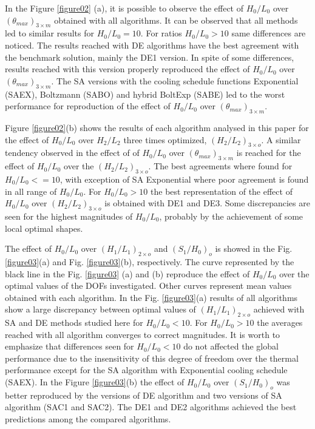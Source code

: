 \documentclass[12pt,fleqn]{article}
\begin{document}
In the Figure \ref{figure02} (a), it is possible to observe the effect of $H_{0}/L_{0}$ over $({\theta}_{max})_{3\times m}$ obtained with all algorithms. It can be observed that all methods led to similar results for $H_{0}/L_{0}=10$. For ratios $H_{0}/L_{0}>10$ same differences are noticed. The results reached with DE algorithms have the best agreement with the benchmark solution, mainly the DE1 version. In spite of some differences, results reached with this version properly reproduced the effect of $H_{0}/L_{0}$ over $({\theta}_{max})_{3\times m}$. The SA versions with the cooling schedule functions Exponential (SAEX), Boltzmann (SABO) and hybrid BoltExp (SABE) led to the worst performance for reproduction of the effect of  $H_{0}/L_{0}$ over $({\theta}_{max})_{3\times m}$.

Figure \ref{figure02}(b) shows the results of each algorithm analysed in this paper for the effect of  $H_{0}/L_{0}$ over $H_{2}/L_{2}$ three times optimized, $(H_{2}/L_{2})_{3\times o}$. A similar tendency observed in the effect of of $H_{0}/L_{0}$ over $({\theta}_{max})_{3\times m}$ is reached for the effect of $H_{0}/L_{0}$ over the $(H_{2}/L_{2})_{3\times o}$. The best agreements where found for $H_{0}/L_{0}<=10$, with exception of SA Exponential where poor agreement is found in all range of $H_{0}/L_{0}$. For $H_{0}/L_{0}>10$ the best representation of the effect of $H_{0}/L_{0}$ over $(H_{2}/L_{2})_{3\times o}$ is obtained with DE1 and DE3. Some discrepancies are seen for the highest magnitudes of $H_{0}/L_{0}$, probably by the achievement of some local optimal shapes.

The effect of $H_{0}/L_{0}$ over $(H_{1}/L_{1})_{2\times o}$ and $(S_{1}/H_{0})_{o}$ is showed in the Fig. \ref{figure03}(a) and Fig. \ref{figure03}(b), respectively. The curve represented by the black line in the Fig. \ref{figure03} (a) and (b) reproduce the effect of $H_{0}/L_{0}$ over the optimal values of the DOFs investigated. Other curves represent mean values obtained with each algorithm. In the Fig. \ref{figure03}(a) results of all algorithms show a large discrepancy between optimal values of $(H_{1}/L_{1})_{2\times o}$ achieved with SA and DE methods studied here for $H_{0}/L_{0}<10$. For $H_{0}/L_{0}>10$ the averages reached with all algorithm converges to correct magnitudes. It is worth to emphasize that differences seen for $H_{0}/L_{0}<10$ do not affected the global performance due to the insensitivity of this degree of freedom over the thermal performance except for the SA algorithm with Exponential cooling schedule (SAEX). In the Figure \ref{figure03}(b) the effect of $H_{0}/L_{0}$ over $(S_{1}/H_{0})_{o}$ was better reproduced by the versions of DE algorithm and two versions of SA algorithm (SAC1 and SAC2). The DE1 and DE2 algorithms achieved the best predictions among the compared algorithms.
\end{document}
